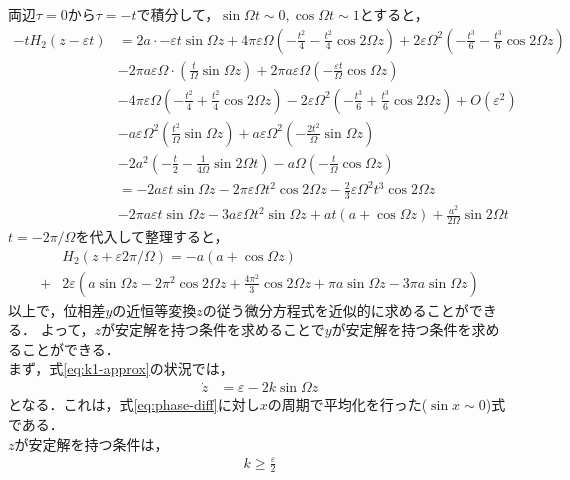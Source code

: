 \documentclass[../main]{subfiles}
\begin{document}
    両辺$\tau=0$から$\tau=-t$で積分して，$\sin\Omega t\sim 0,\cos\Omega t\sim 1$とすると，
    \begin{align*}
        -tH_2(z-\varepsilon t)&=2a\cdot -\varepsilon t\sin\Omega z+4\pi\varepsilon\Omega\left( -\frac{t^2}{4} -\frac{t^2}{4}\cos 2\Omega z\right)+2\varepsilon\Omega^2\left( -\frac{t^3}{6} -\frac{t^3}{6}\cos 2\Omega z\right)\\
        &-2\pi a\varepsilon\Omega\cdot\left(\frac{t}{\Omega}\sin\Omega z\right)+2\pi a\varepsilon\Omega\left(-\frac{\varepsilon t}{\Omega}\cos\Omega z\right)\\
        &-4\pi\varepsilon\Omega\left(-\frac{t^2}{4}+\frac{t^2}{4}\cos 2\Omega z\right)-2\varepsilon\Omega^2\left( -\frac{t^3}{6} +\frac{t^3}{6}\cos 2\Omega z\right)+O(\varepsilon^2)\\
        &-a\varepsilon\Omega^2\left( \frac{t^2}{\Omega}\sin\Omega z \right)+a\varepsilon\Omega^2\left( -\frac{2t^2}{\Omega}\sin\Omega z \right)\\
        &-2a^2\left( -\frac{t}{2}-\frac{1}{4\Omega} \sin 2\Omega t\right)-a\Omega \left( -\frac{t}{\Omega} \cos\Omega z\right)\\
        &=-2a\varepsilon t\sin\Omega z-2\pi\varepsilon\Omega t^2\cos 2\Omega z-\frac{2}{3}\varepsilon\Omega^2t^3\cos 2\Omega z\\
        &-2\pi a\varepsilon t\sin\Omega z-3a\varepsilon\Omega t^2\sin\Omega z+at(a+\cos\Omega z)+\frac{a^2}{2\Omega}\sin 2\Omega t
    \end{align*}
    $t=-2\pi/\Omega$を代入して整理すると，
    \begin{align*}
        &H_2(z+\varepsilon 2\pi/\Omega)=-a(a+\cos\Omega z)\\
        +&2\varepsilon\left( a\sin\Omega z-2\pi^2\cos2\Omega z+\frac{4\pi^2}{3} \cos 2\Omega z+\pi a\sin\Omega z-3\pi a\sin\Omega z\right)
    \end{align*}
    以上で，位相差$y$の近恒等変換$z$の従う微分方程式を近似的に求めることができる．
    よって，$z$が安定解を持つ条件を求めることで$y$が安定解を持つ条件を求めることができる．\\
    まず，式\eqref{eq:k1-approx}の状況では，
    \begin{align*}
        \dot{z}&=\varepsilon-2k\sin\Omega z
    \end{align*}
    となる．これは，式\eqref{eq:phase-diff}に対し$x$の周期で平均化を行った($\sin x\sim 0$)式である．\\
    $z$が安定解を持つ条件は，
    \begin{align*}
        k\geq\frac{\varepsilon}{2}
    \end{align*}
\end{document}
